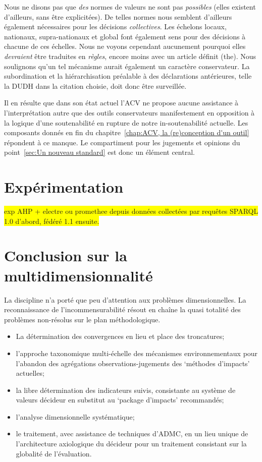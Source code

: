 Nous ne disons pas que \emph{des} normes de valeurs ne sont pas \emph{possibles} (elles existent d'ailleurs, sans être explicitées).
De telles normes nous semblent d'ailleurs également nécessaires pour les décisions \emph{collectives}.
Les échelons locaux, nationaux, supra-nationaux et global font également sens pour des décisions à chacune de ces échelles.
Nous ne voyons cependant aucunement pourquoi elles \emph{devraient} être traduites en \emph{règles}, encore moins avec un article définit (the).
Nous soulignons qu'un tel mécanisme aurait également un caractère conservateur.
La subordination et la hiérarchisation préalable à des déclarations antérieures, telle la \gls{DUDH} dans la citation choisie, doit donc être surveillée.

Il en résulte que dans son état actuel l'ACV ne propose aucune assistance à l'interprétation autre que des outils conservateurs manifestement en opposition à la logique d'une soutenabilité en rupture de notre in-soutenabilité actuelle.
Les composants donnés en fin du chapitre~\ref{chap:ACV, la (re)conception d'un outil} répondent à ce manque.
Le compartiment pour les jugements et opinions du point~\ref{sec:Un nouveau standard} est donc un élément central.

\section{Expérimentation}
\begin{center}
\colorbox{yellow}{exp AHP + electre ou promethee depuis données collectées par requêtes SPARQL 1.0 d'abord, fédéré 1.1 ensuite.}
\end{center}
\section{Conclusion sur la multidimensionnalité}

La discipline n'a porté que peu d'attention aux problèmes dimensionnelles.
La reconnaissance de l'incommensurabilité résout en chaîne la quasi totalité des problèmes non-résolus sur le plan méthodologique.

\begin{itemize}
\item La détermination des convergences en lieu et place des troncatures;
\item l'approche taxonomique multi-échelle des mécanismes environnementaux pour l'abandon des agrégations observations-jugements des `méthodes d'impacts' actuelles;
\item la libre détermination des indicateurs suivis, consistante au système de valeurs décideur en substitut au `package d'impacts' recommandés;
\item l'analyse dimensionnelle systématique;
\item le traitement, avec assistance de techniques d'\gls{ADMC}, en un lieu unique de l'architecture axiologique du décideur pour un traitement consistant sur la globalité de l'évaluation.
\end{itemize}

